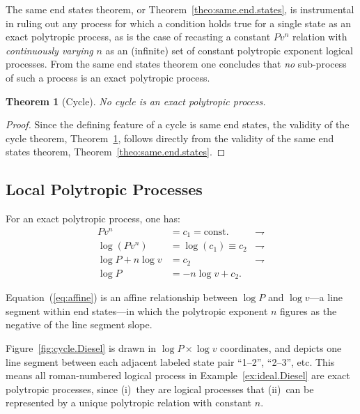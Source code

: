 \documentclass[10pt,a4paper]{article}
\newtheorem{theorem}{Theorem}
\begin{document}
\begin{multicols*}{2}
    The same end states  theorem,  or  Theorem~\ref{theo:same.end.states},  is  instrumental  in
    ruling out any process for which a condition holds true for  a  single  state  as  an  exact
    polytropic  process,  as  is  the  case  of  recasting  a  constant  $Pv^n$  relation   with
    \emph{continuously varying} $n$ as an (infinite) set of constant polytropic exponent logical
    processes. From the same end states theorem one concludes that \emph{no} sub-process of such
    a process is an exact polytropic process.

    \begin{theorem}[Cycle]\label{theo:cycle}
        No cycle is an exact polytropic process.
    \end{theorem}

    \begin{proof}
        Since the defining feature of a cycle is same end states,  the  validity  of  the  cycle
        theorem, Theorem~\ref{theo:cycle}, follows directly from the validity of  the  same  end
        states theorem, Theorem~\ref{theo:same.end.states}.
    \end{proof}

    \subsection{Local Polytropic Processes}

    For an exact polytropic process, one has: %
    \begin{align}
        Pv^n & = c_1 = \text{const.}        & \rightharpoondown\\
        \log(Pv^n) & = \log(c_1) \equiv c_2 & \rightharpoondown\\
        \log P + n\log v & = c_2            & \rightharpoondown\\
        \log P & = -n\log v + c_2. \label{eq:affine}
    \end{align}

    Equation~(\ref{eq:affine}) is an affine relationship between $\log P$ and $\log v$---a  line
    segment within end states---in which the polytropic exponent $n$ figures as the negative  of
    the line segment slope.

    Figure~\ref{fig:cycle.Diesel} is drawn in $\log P \times \log v$  coordinates,  and  depicts
    one line segment between each adjacent labeled state  pair  ``1--2'',  ``2--3'',  etc.  This
    means  all  roman-numbered  logical  process  in  Example~\ref{ex:ideal.Diesel}  are   exact
    polytropic processes, since (i)~they are logical processes that (ii)~can be represented by a
    unique polytropic relation with constant $n$.


\end{multicols*}
\end{document}
